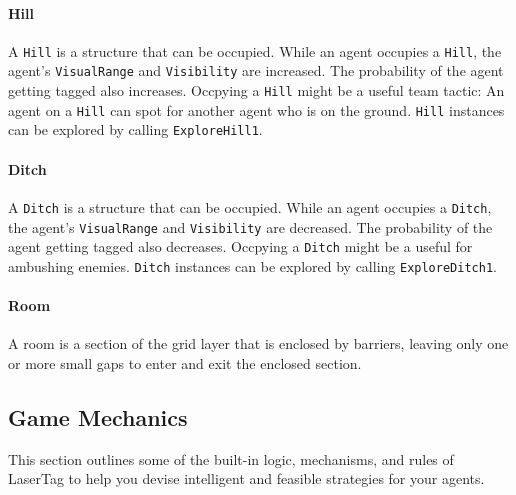 \documentclass[
  a4paper,
  english,
  DIV=16,
  11pt,
  parskip=half,
  dvipsnames,
  listof=totoc,		     %
  index=totoc,		     %
  bibliography=totoc,	 %
]{scrartcl}
\begin{document}
\paragraph{Hill} \label{par:hillDesc}
A \texttt{Hill} is a structure that can be occupied. While an agent occupies a \texttt{Hill}, the agent's \texttt{VisualRange} and \texttt{Visibility} are increased. The probability of the agent getting tagged also increases. Occpying a \texttt{Hill} might be a useful team tactic: An agent on a \texttt{Hill} can spot for another agent who is on the ground. \texttt{Hill} instances can be explored by calling \texttt{ExploreHill1}.
%
\paragraph{Ditch} \label{par:ditchDesc}
A \texttt{Ditch} is a structure that can be occupied. While an agent occupies a \texttt{Ditch}, the agent's \texttt{VisualRange} and \texttt{Visibility} are decreased. The probability of the agent getting tagged also decreases. Occpying a \texttt{Ditch} might be a useful for ambushing enemies. \texttt{Ditch} instances can be explored by calling \texttt{ExploreDitch1}.
%
\paragraph{Room} \label{par:roomDesc}
A room is a section of the grid layer that is enclosed by barriers, leaving only one or more small gaps to enter and exit the enclosed section.
%
\subsection{Game Mechanics} \label{ssec:gameMechs}
%
This section outlines some of the built-in logic, mechanisms, and rules of LaserTag to help you devise intelligent and feasible strategies for your agents.
%
\end{document}
